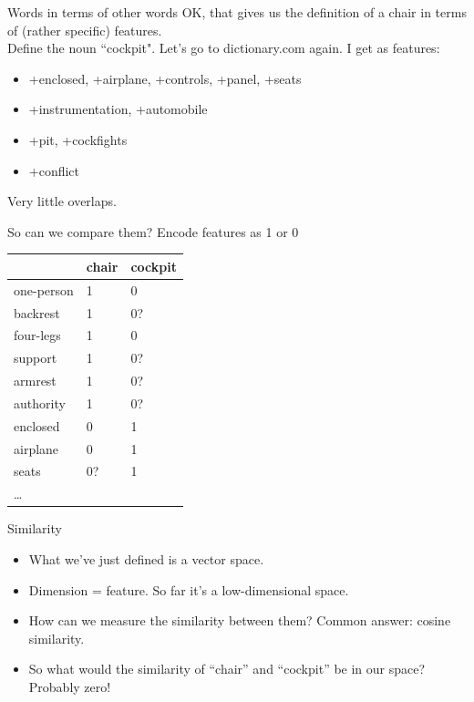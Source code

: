 \documentclass[xcolor=pdftex,x11names,table,hyperref]{beamer}
\begin{document}
\begin{frame}{Words in terms of other words}
  OK, that gives us the definition of a chair in terms of (rather specific)
  features.\\
  Define the noun ``cockpit". Let's go to dictionary.com again.  I get as features:
  \begin{itemize}
  \item +enclosed, +airplane, +controls, +panel, +seats
  \item +instrumentation, +automobile
  \item +pit, +cockfights
  \item +conflict
  \end{itemize}
  Very little overlaps.
\end{frame}

\begin{frame}{So can we compare them?}
  Encode features as 1 or 0\\
  {\small
  \begin{tabular}{|l|l|l|}
    \hline
    & chair & cockpit \\
    \hline
    one-person & 1 & 0 \\
    backrest & 1 & 0? \\
    four-legs & 1 & 0 \\
    support & 1 & 0? \\
    armrest & 1 & 0? \\
    authority & 1 & 0?\\
    enclosed & 0 & 1\\
    airplane & 0 & 1 \\
    seats & 0? & 1 \\
    \ldots &&\\
    \hline
  \end{tabular}
  }
\end{frame}

\begin{frame}{Similarity}
  \begin{itemize}
  \item What we've just defined is a vector space.\pause
  \item Dimension = feature. So far it's a low-dimensional space.\pause
  \item How can we measure the similarity between them? Common answer:
    cosine similarity.\pause
  \item So what would the similarity of ``chair'' and ``cockpit'' be in our space? Probably zero!
  \end{itemize}
\end{frame}
\end{document}
